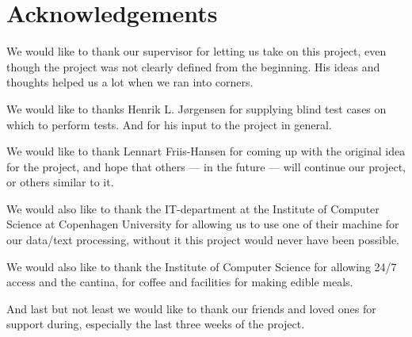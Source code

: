 \chapter*{Acknowledgements}
We would like to thank our supervisor for letting us take on this
project, even though the project was not clearly defined from the
beginning. His ideas and thoughts helped us a lot when we ran into
corners.

We would like to thanks Henrik L. J\o rgensen for supplying blind test
cases on which to perform tests. And for his input to the project in
general.

We would like to thank Lennart Friis-Hansen for coming up with the
original idea for the project, and hope that others --- in the future
--- will continue our project, or others similar to it.

We would also like to thank the IT-department at the Institute of
Computer Science at Copenhagen University for allowing us to use one
of their machine for our data/text processing, without it this project
would never have been possible.

We would also like to thank the Institute of Computer Science for
allowing 24/7 access and the cantina, for coffee and facilities for
making edible meals.

And last but not least we would like to thank our friends and loved
ones for support during, especially the last three weeks of the
project.
